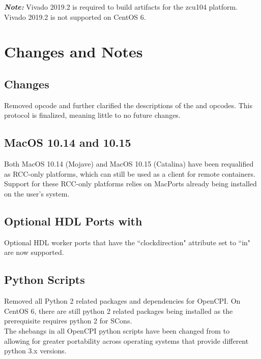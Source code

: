 \textit{\textbf{Note:}} Vivado 2019.2 is required to build artifacts for the zcu104 platform. Vivado 2019.2 is not supported on CentOS 6.


\section{Changes and Notes}
\subsection{ Changes}
\label{sec:17_cswm}
Removed  opcode and further clarified the descriptions of the  and  opcodes. This protocol is finalized, meaning little to no future changes.

\subsection{MacOS 10.14 and 10.15}
\label{sec:17_mojave}
Both MacOS 10.14 (Mojave) and MacOS 10.15 (Catalina) have been requalified as RCC-only platforms, which can still be used as a client for remote containers. Support for these RCC-only platforms relies on MacPorts already being installed on the user's system.

\subsection{Optional HDL Ports with }
\label{sec:17_hdl_clockdirection}
Optional HDL worker ports that have the ``clockdirection" attribute set to ``in" are now supported.

\subsection{Python Scripts}
\label{sec:17_python_scripts}
Removed all Python 2 related packages and dependencies for OpenCPI. On CentOS 6, there are still python 2 related packages being installed as the  prerequisite requires python 2 for SCons.\\

The shebangs in all OpenCPI python scripts have been changed from  to\\  allowing for greater portability across operating systems that provide different python 3.x versions.\\

